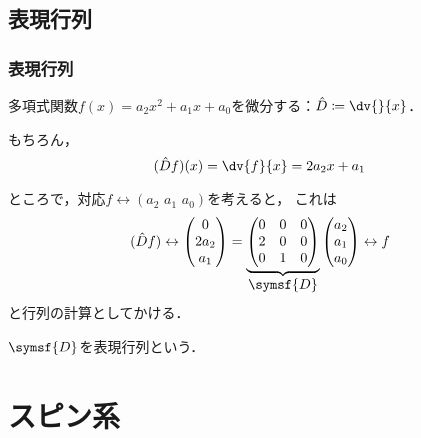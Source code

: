 \documentclass[
    10pt,
    ]{sotsu-beamer}
\begin{document}
\subsection{表現行列}


\begin{frame}
    \frametitle{表現行列}

    多項式関数$f(x) = a_2 x^2 + a_1 x + a_0$を微分する：$\hat{D} \coloneq \dv{}{x}$．

    \pause

    もちろん，
    \begin{equation*}
        (\hat{D} f) (x) = \dv{f}{x} = 2 a_2 x + a_1
    \end{equation*}

    \pause

    ところで，対応$f \leftrightarrow (a_2 \,\, a_1 \,\, a_0)$を考えると，
    これは
    \begin{equation*}
        (\hat{D} f)
        \leftrightarrow
        \begin{pmatrix}
            0  \\  2 a_2  \\  a_1
        \end{pmatrix}
        =
        \underbrace{
        \begin{pmatrix}
            0  &  0  &  0  \\
            2  &  0  &  0  \\
            0  &  1  &  0
        \end{pmatrix}
        }_{\text{\normalsize$\symsf{D}$}}
        \begin{pmatrix}
            a_2  \\  a_1  \\  a_0
        \end{pmatrix}
        \leftrightarrow
        f
    \end{equation*}
    と行列の計算としてかける．

    \pause

    $\symsf{D}$を\alert{表現行列}という．

\end{frame}



\section{スピン系}
\end{document}
